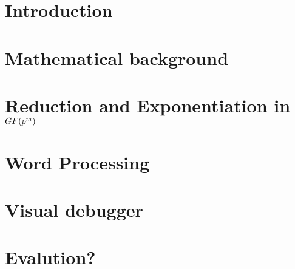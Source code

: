 \documentclass{ufscThesis}
\begin{document}
\capa  
\folhaderosto %
\folhaaprovacao
\paginaresumo
\paginaabstract
\listadefiguras
\listadetabelas 
\listadeabreviaturas
\listadesimbolos
\sumario

\chapter{Introduction}


\chapter{Mathematical background}\label{cap:background}


\chapter{Reduction and Exponentiation in $GF(\MakeLowercase{p}^\MakeLowercase{m})$}\label{cap:red_exp}


\chapter{Word Processing}\label{cap:word}


\chapter{Visual debugger}\label{cap:visual}


\chapter{Evalution?}\label{cap:evaluation}

\end{document}
